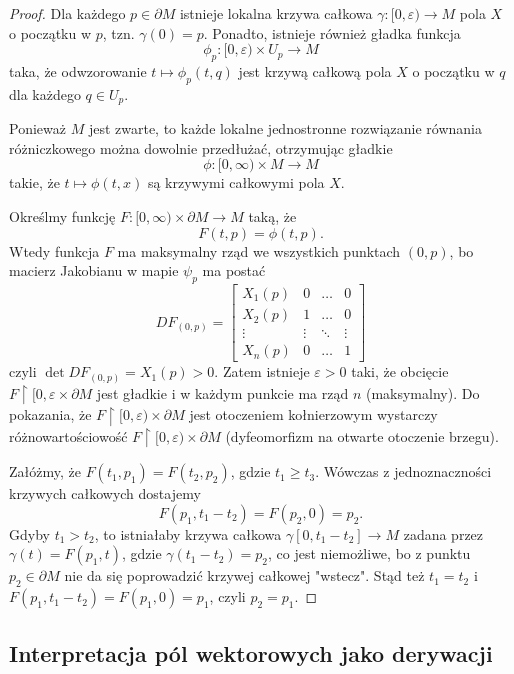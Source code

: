 \begin{example}
\begin{proof}
    Dla każdego $p\in\partial M$ istnieje lokalna krzywa całkowa $\gamma:[0,\varepsilon)\to M$ pola $X$ o początku w $p$, tzn. $\gamma(0)=p$. Ponadto, istnieje również gładka funkcja
    $$\phi_p:[0,\varepsilon)\times U_p\to M$$
    taka, że odwzorowanie $t\mapsto\phi_p(t,q)$ jest krzywą całkową pola $X$ o początku w $q$ dla każdego $q\in U_p$.
    
    Ponieważ $M$ jest zwarte, to każde lokalne jednostronne rozwiązanie równania różniczkowego można dowolnie przedłużać, otrzymując gładkie
    $$\phi:[0,\infty)\times M\to M$$
    takie, że $t\mapsto \phi(t,x)$ są krzywymi całkowymi pola $X$.

    Określmy funkcję $F:[0,\infty)\times\partial M\to M$ taką, że
    $$F(t,p)=\phi(t,p).$$
    Wtedy funkcja $F$ ma maksymalny rząd we wszystkich punktach $(0,p)$, bo macierz Jakobianu w mapie $\psi_p$ ma postać
    $$DF_{(0,p)}=\begin{bmatrix}X_1(p)&0&\hdots&0\\X_2(p)&1&\hdots&0\\\vdots&\vdots&\ddots&\vdots\\X_n(p)&0&\hdots&1\end{bmatrix}$$
    czyli $\det DF_{(0,p)}=X_1(p)>0$. Zatem istnieje $\varepsilon>0$ taki, że obcięcie $F\restriction[0,\varepsilon\times\partial M$ jest gładkie i w każdym punkcie ma rząd $n$ (maksymalny). Do pokazania, że $F\restriction[0,\varepsilon)\times\partial M$ jest otoczeniem kołnierzowym wystarczy różnowartościowość $F\restriction[0,\varepsilon)\times\partial M$ (dyfeomorfizm na otwarte otoczenie brzegu).

    Załóżmy, że $F(t_1,p_1)=F(t_2,p_2)$, gdzie $t_1\geq t_3$. Wówczas z jednoznaczności krzywych całkowych dostajemy
    $$F(p_1,t_1-t_2)=F(p_2,0)=p_2.$$
    Gdyby $t_1>t_2$, to istniałaby krzywa całkowa $\gamma[0,t_1-t_2]\to M$ zadana przez $\gamma(t)=F(p_1,t)$, gdzie $\gamma(t_1-t_2)=p_2$, co jest niemożliwe, bo z punktu $p_2\in\partial M$ nie da się poprowadzić krzywej całkowej "wstecz". Stąd też $t_1=t_2$ i $F(p_1,t_1-t_2)=F(p_1,0)=p_1$, czyli $p_2=p_1$.
  \end{proof}
\end{example}

\subsection{Interpretacja pól wektorowych jako derywacji}

